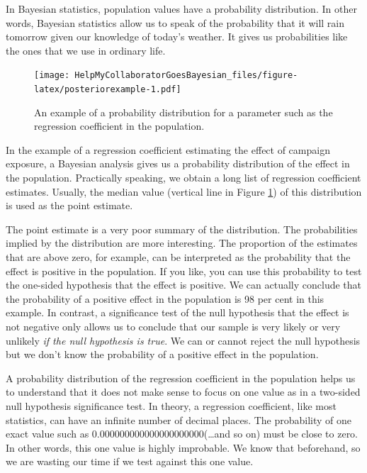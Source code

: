 \documentclass[
  english,
  doc]{apa6}
\begin{document}
In Bayesian statistics, population values have a probability distribution. In other words, Bayesian statistics allow us to speak of the probability that it will rain tomorrow given our knowledge of today's weather. It gives us probabilities like the ones that we use in ordinary life.

\begin{figure}
\centering
\texttt{[image: HelpMyCollaboratorGoesBayesian\_files/figure-latex/posteriorexample-1.pdf]}
\caption{\label{fig:posteriorexample}An example of a probability distribution for a parameter such as the regression coefficient in the population.}
\end{figure}

In the example of a regression coefficient estimating the effect of campaign exposure, a Bayesian analysis gives us a probability distribution of the effect in the population. Practically speaking, we obtain a long list of regression coefficient estimates. Usually, the median value (vertical line in Figure \ref{fig:posteriorexample}) of this distribution is used as the point estimate.

The point estimate is a very poor summary of the distribution. The probabilities implied by the distribution are more interesting. The proportion of the estimates that are above zero, for example, can be interpreted as the probability that the effect is positive in the population. If you like, you can use this probability to test the one-sided hypothesis that the effect is positive. We can actually conclude that the probability of a positive effect in the population is 98 per cent in this example. In contrast, a significance test of the null hypothesis that the effect is not negative only allows us to conclude that our sample is very likely or very unlikely \emph{if the null hypothesis is true}. We can or cannot reject the null hypothesis but we don't know the probability of a positive effect in the population.

A probability distribution of the regression coefficient in the population helps us to understand that it does not make sense to focus on one value as in a two-sided null hypothesis significance test. In theory, a regression coefficient, like most statistics, can have an infinite number of decimal places. The probability of one exact value such as 0.000000000000000000000(\ldots and so on) must be close to zero. In other words, this one value is highly improbable. We know that beforehand, so we are wasting our time if we test against this one value.
\end{document}

